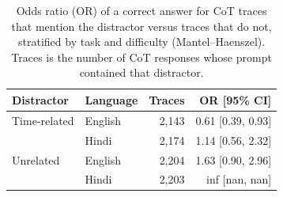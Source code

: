 \begin{table}[ht]
\centering
\small
\begin{tabular}{llrr}
\toprule
Distractor & Language & Traces & OR [95\% CI] \\
\midrule
Time-related & English & 2,143 & 0.61 [0.39, 0.93] \\
 & Hindi & 2,174 & 1.14 [0.56, 2.32] \\
\midrule
Unrelated & English & 2,204 & 1.63 [0.90, 2.96] \\
 & Hindi & 2,203 & inf [nan, nan] \\
\bottomrule
\end{tabular}
\caption{Odds ratio (OR) of a correct answer for CoT traces that mention the distractor versus traces that do not, stratified by task and difficulty (Mantel--Haenszel). Traces is the number of CoT responses whose prompt contained that distractor.}
\label{tab:mention-or}
\end{table}
